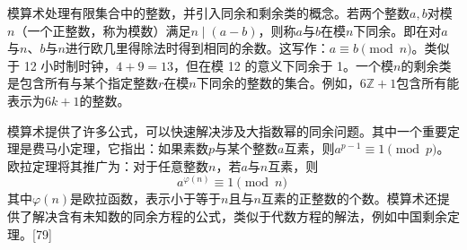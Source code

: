 模算术处理有限集合中的整数，并引入同余和剩余类的概念。若两个整数$a, b$对模$n$（一个正整数，称为模数）满足$n \mid (a-b)$，则称$a$与$b$在模$n$下同余。即在对$a$与$n$、$b$与$n$进行欧几里得除法时得到相同的余数。这写作：$a \equiv b \pmod{n}$。类似于 12 小时制时钟，$4 + 9 = 13$，但在模 12 的意义下同余于 1。一个模$n$的剩余类是包含所有与某个指定整数$r$在模$n$下同余的整数的集合。例如，$6\mathbb{Z} + 1$包含所有能表示为$6k+1$的整数。

模算术提供了许多公式，可以快速解决涉及大指数幂的同余问题。其中一个重要定理是费马小定理，它指出：如果素数$p$与某个整数$a$互素，则$a^{p-1} \equiv 1 \pmod{p}$。欧拉定理将其推广为：对于任意整数$n$，若$a$与$n$互素，则
$$
a^{\varphi(n)} \equiv 1 \pmod{n}~
$$
其中$\varphi(n)$是欧拉函数，表示小于等于$n$且与$n$互素的正整数的个数。模算术还提供了解决含有未知数的同余方程的公式，类似于代数方程的解法，例如中国剩余定理。[79]
